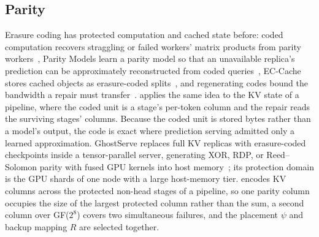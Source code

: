 \subsection{Parity}

Erasure coding has protected computation and cached state before: coded
computation recovers straggling or failed workers' matrix products from
parity workers~\cite{lee2018speeding}, Parity Models learn a parity model so
that an unavailable replica's prediction can be approximately reconstructed
from coded queries~\cite{kosaian2019parity}, EC-Cache stores cached objects as
erasure-coded splits~\cite{rashmi2016eccache}, and regenerating codes bound
the bandwidth a repair must transfer~\cite{dimakis2010network}.  \sys{} applies
the same idea to the KV state of a pipeline, where the coded unit is a
stage's per-token column and the repair reads the surviving stages'
columns.  Because the coded unit is stored bytes rather than a model's
output, the code is exact where prediction serving admitted only a learned
approximation.  GhostServe replaces full KV replicas with erasure-coded checkpoints inside a
tensor-parallel server, generating XOR, RDP, or Reed--Solomon parity with
fused GPU kernels into host memory~\cite{jayakody2026ghostserve}; its
protection domain is the GPU shards of one node with a large host-memory
tier.  \sys{} encodes KV columns across the protected non-head stages of a
pipeline, so one parity column occupies the size of the largest protected
column rather than the sum, a second column over GF($2^8$) covers two
simultaneous failures, and the placement $\psi$ and backup mapping $R$ are
selected together.

